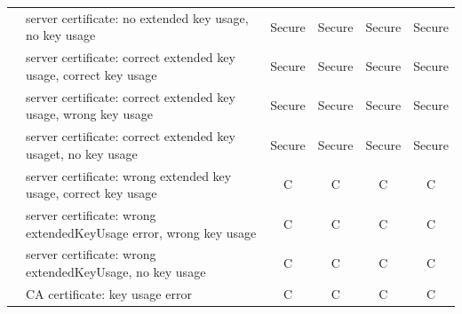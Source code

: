 \begin{table}[htbp]
\begin{tabular}{p{2.5cm}|p{8cm}|cccc}
                                                                                                    & server certificate: no extended key usage, no key usage                                           & Secure               & Secure               & Secure               & Secure               \\
                                                                                                    & server certificate: correct extended key usage, correct key usage                                     & Secure               & Secure               & Secure               & Secure               \\
                                                                                                    & server certificate: correct extended key usage, wrong key usage                                     & Secure               & Secure               & Secure               & Secure               \\
                                                                                                    & server certificate: correct extended key usaget, no key usage                                       & Secure               & Secure               & Secure               & Secure               \\
                                                                                                    & server certificate: wrong extended key usage, correct key usage                                     & C                    & C                    & C                    & C                    \\
                                                                                                    & server certificate: wrong extendedKeyUsage error, wrong key usage                                 & C                    & C                    & C                    & C                    \\
                                                                                                    & server certificate: wrong extendedKeyUsage, no key usage                                          & C                    & C                    & C                    & C                    \\
                                                                                                    & CA certificate: key usage error                                                                     & C                    & C                    & C                    & C                    \\ \hline

\end{tabular}
\end{table}
